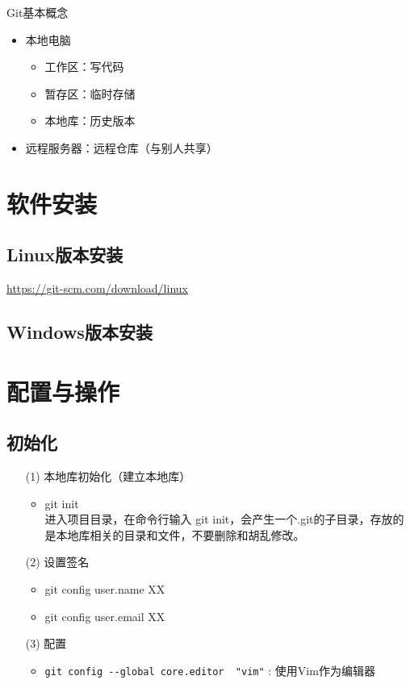 Git基本概念
\begin{itemize}
\item 本地电脑
\begin{itemize}
\item 工作区：写代码
\item 暂存区：临时存储
\item 本地库：历史版本
\end{itemize}

\item 远程服务器：远程仓库（与别人共享）
\end{itemize}






\section{软件安装}
\subsection{Linux版本安装}
\url{https://git-scm.com/download/linux}


\subsection{Windows版本安装}


\section{配置与操作}
\subsection{初始化}
\begin{itemize}
\item[(1)] 本地库初始化（建立本地库）
\begin{itemize}
\item git init\\
进入项目目录，在命令行输入 git init，会产生一个.git的子目录，存放的是本地库相关的目录和文件，不要删除和胡乱修改。
\end{itemize}

\item[(2)] 设置签名
\begin{itemize}
\item git config user.name XX
\item git config user.email XX
\end{itemize}

\item [(3)] 配置
\begin{itemize}
\item \verb|git config --global core.editor  "vim"| : 使用Vim作为编辑器
\end{itemize}

\end{itemize}



